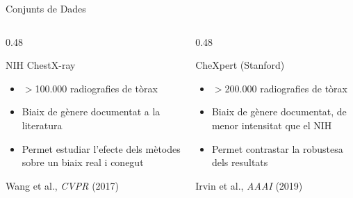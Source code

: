\documentclass[aspectratio=169,12pt]{beamer}
\begin{document}
\begin{frame}{Conjunts de Dades}
  \begin{columns}[T]
    \begin{column}{0.48\textwidth}
      \begin{block}{NIH ChestX-ray}
        \begin{itemize}
          \item $>$100.000 radiografies de tòrax
          \item Biaix de gènere documentat a la literatura
          \item Permet estudiar l'efecte dels mètodes sobre un biaix real i conegut
        \end{itemize}
      \end{block}
      {\tiny\color{gray} Wang et al., \textit{CVPR} (2017)}
    \end{column}
    \begin{column}{0.48\textwidth}
      \begin{block}{CheXpert (Stanford)}
        \begin{itemize}
          \item $>$200.000 radiografies de tòrax
          \item Biaix de gènere documentat, de menor intensitat que el NIH
          \item Permet contrastar la robustesa dels resultats
        \end{itemize}
      \end{block}
      {\tiny\color{gray} Irvin et al., \textit{AAAI} (2019)}
    \end{column}
  \end{columns}

\end{frame}
\end{document}
